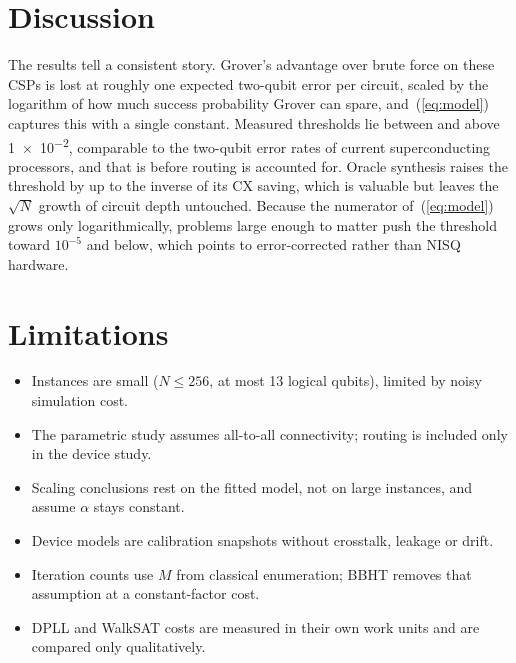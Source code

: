 \documentclass[conference]{IEEEtran}
\begin{document}
\section{Discussion}

The results tell a consistent story. Grover's advantage over brute force on these CSPs is lost at roughly one expected two-qubit error per circuit, scaled by the logarithm of how much success probability Grover can spare, and~(\ref{eq:model}) captures this with a single constant. Measured thresholds lie between \thrLowest{} and above \num{1e-2}, comparable to the two-qubit error rates of current superconducting processors, and that is before routing is accounted for. Oracle synthesis raises the threshold by up to the inverse of its CX saving, which is valuable but leaves the $\sqrt{N}$ growth of circuit depth untouched. Because the numerator of~(\ref{eq:model}) grows only logarithmically, problems large enough to matter push the threshold toward $10^{-5}$ and below, which points to error-corrected rather than NISQ hardware.

\section{Limitations}
\begin{itemize}
\item Instances are small ($N\le 256$, at most 13 logical qubits), limited by noisy simulation cost.
\item The parametric study assumes all-to-all connectivity; routing is included only in the device study.
\item Scaling conclusions rest on the fitted model, not on large instances, and assume $\alpha$ stays constant.
\item Device models are calibration snapshots without crosstalk, leakage or drift.
\item Iteration counts use $M$ from classical enumeration; BBHT removes that assumption at a constant-factor cost.
\item DPLL and WalkSAT costs are measured in their own work units and are compared only qualitatively.
\end{itemize}

\end{document}
